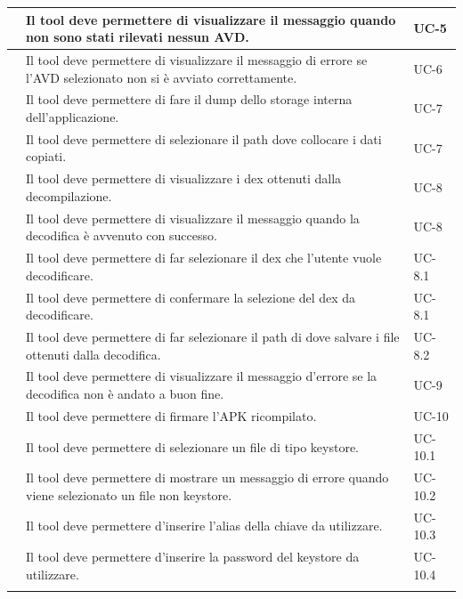 \begin{center}
\begin{longtable}{ | c| C{7cm} |C{3cm} |}
         &Il tool deve permettere di visualizzare il messaggio quando non sono stati rilevati nessun AVD. & UC-5 \\\hline
         &Il tool deve permettere di visualizzare il messaggio di errore se l'AVD selezionato non si è avviato correttamente.& UC-6 \\\hline
         &Il tool deve permettere di fare il dump dello storage interna dell'applicazione.& UC-7 \\\hline
         & Il tool deve permettere di selezionare il path dove collocare i dati copiati.& UC-7\\\hline
        \setcounter{subCount}{0}

         &Il tool deve permettere di visualizzare i dex ottenuti dalla decompilazione.& UC-8\\\hline
         & Il tool deve permettere di visualizzare il messaggio quando la decodifica è avvenuto con successo.& UC-8\\\hline
         & Il tool deve permettere di far selezionare il dex che l'utente vuole decodificare.& UC-8.1\\\hline
         & Il tool deve permettere di confermare la selezione del dex da decodificare.& UC-8.1\\\hline
         & Il tool deve permettere di far selezionare il path di dove salvare i file ottenuti dalla decodifica.& UC-8.2\\\hline
        \setcounter{subCount}{0}

         &Il tool deve permettere di visualizzare il messaggio d'errore se la decodifica non è andato a buon fine.& UC-9 \\\hline

        & Il tool deve permettere di firmare l'APK ricompilato.& UC-10 \\\hline
         & Il tool deve permettere di selezionare un file di tipo keystore.&UC-10.1\\\hline
        & Il tool deve permettere di mostrare un messaggio di errore quando viene selezionato un file non keystore. & UC-10.2 \\\hline
         & Il tool deve permettere d'inserire l'alias della chiave da utilizzare.& UC-10.3 \\\hline
         & Il tool deve permettere d'inserire la password del keystore da utilizzare.& UC-10.4 \\\hline
        \setcounter{subCount}{0}


\end{longtable}
\end{center}
